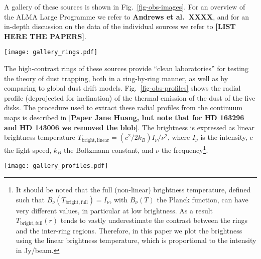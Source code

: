 \documentclass{aa}
\begin{document}
A gallery of these sources is shown in Fig.~\ref{fig-obs-images}.
For an overview of the ALMA Large Programme we refer to {\bf Andrews et
  al.~XXXX}, and for an in-depth discussion on the data of the individual
sources we refer to {\bf [LIST HERE THE PAPERS]}.

\begin{figure*}
\centerline{\texttt{[image: gallery\_rings.pdf]}}
\caption{\label{fig-obs-images}The continuum maps in
  band 6 of the five disks in our sample which have the most pronounced rings.
  The eight highest contrast rings, which are the topic of this paper,
  are marked in the images. For a detailed description of these
  data, see {\bf Guzm\'an et al.~(2018)} for AS 209, {\bf XXXX}}
\end{figure*}

The high-contrast rings of these sources provide ``clean laboratories''
for testing the theory of dust trapping, both in a ring-by-ring manner, as well
as by comparing to global dust drift models. Fig.\ \ref{fig-obs-profiles}
shows the radial profile (deprojected for
inclination) of the thermal emission of the dust of the five disks. The
procedure used to extract these radial profiles from the continuum maps
is described in {\bf [Paper Jane Huang, but note that for HD 163296 and
HD 143006 we removed the blob]}. The
brightness is expressed as linear brightness temperature
$T_{\mathrm{bright,linear}}=(c^2/2k_B)I_\nu/\nu^2$, where $I_\nu$ is the
intensity, $c$ the light speed, $k_B$ the Boltzmann constant, and $\nu$ the
frequency\footnote{It should be noted that the full (non-linear) brightness temperature,
defined such that $B_\nu(T_{\mathrm{bright,full}})=I_\nu$, with $B_\nu(T)$ the
Planck function, can have very different values, in particular at low
brightness. As a result $T_{\mathrm{bright,full}}(r)$ tends to vastly
underestimate the contrast between the rings and the inter-ring
regions. Therefore, in this paper we plot the brightness using the linear
brightness temperature, which is proportional to the intensity in Jy/beam.}.

\begin{figure*}
\centerline{\texttt{[image: gallery\_profiles.pdf]}}
\caption{\label{fig-obs-profiles}The linear brightness temperature in
  band 6 of the five disks in our sample which have the most pronounced rings.
  The vertical axis is logarithmic to better show the contrast.
  The eight highest contrast rings are fitted by a Gaussian profile, shown
  as the solid inverse parabolas. The dotted inverse parabolas are Gaussians
  with the width of the ALMA beam. For a detailed description of these
  data, see {\bf Guzm\'an et al.~(2018)} for AS 209, {\bf XXXX}}
\end{figure*}
\end{document}
